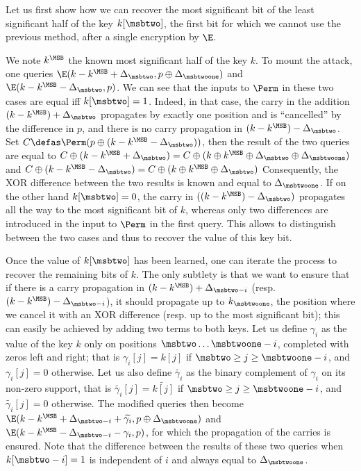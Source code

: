 Let us first show how we can recover the most significant bit of the least significant half of
the key $k[\msbtwo]$, \ie the first bit for which we cannot use the previous method,
after a single encryption by $\E$.

We note $k^\MSB$ the known most significant half of the key $k$.
To mount the attack, one queries $\E(k - k^\MSB + \Delta_\msbtwo, p \oplus \Delta_{\msbtwoone})$ and
$\E(k - k^\MSB - \Delta_\msbtwo, p)$. We can see that the inputs to $\Perm$ in these two cases are equal
iff $k[\msbtwo] = 1$. Indeed, in that case,
the carry in the addition $(k - k^\MSB) + \Delta_\msbtwo$ propagates by exactly one position and is ``cancelled'' by
the difference in $p$, and there is no carry propagation in $(k - k^\MSB) - \Delta_\msbtwo$.
Set $C \defas \Perm(p \oplus (k - k^\MSB - \Delta_\msbtwo))$, then
the result of the two queries are equal to
$C \oplus (k - k^\MSB + \Delta_\msbtwo) = C \oplus (k \oplus k^\MSB \oplus \Delta_\msbtwo \oplus \Delta_\msbtwoone)$ and
$C \oplus (k - k^\MSB - \Delta_\msbtwo) = C \oplus (k \oplus k^\MSB \oplus \Delta_\msbtwo)$
Consequently, the XOR difference between the two results is known and equal to $\Delta_\msbtwoone$.
If on the other hand
$k[\msbtwo] = 0$, the carry in $((k - k^\MSB) - \Delta_\msbtwo)$ propagates all the way to the most significant bit of $k$, whereas only
two differences are introduced in the input to $\Perm$ in the first query. This allows to distinguish between the two cases and thus to recover the value of this key bit.

Once the value of $k[\msbtwo]$ has been learned, one can iterate the process to recover the remaining bits of $k$.
The only subtlety is that we want to ensure that if there is a carry propagation in
$(k - k^\MSB) + \Delta_{\msbtwo - i}$ (resp. $(k - k^\MSB) - \Delta_{\msbtwo - i}$),
it should propagate up to $k_{\msbtwoone}$, the position where we cancel it with an XOR difference
(resp. up to the most significant bit); this can easily be achieved by adding two terms to both keys.
Let us define $\gamma_i$ as the value of the key $k$ only on positions $\msbtwo\ldots\msbtwoone - i$, completed with zeros left and right;
that is $\gamma_i[j] = k[j]$ if $\msbtwo \geq j \geq \msbtwoone - i$, and $\gamma_i[j] = 0$ otherwise.
Let us also define $\widetilde{\gamma_i}$ as the binary complement of $\gamma_i$ on its non-zero support,
that is $\widetilde{\gamma_i}[j] = \widetilde{k[j]}$ if $\msbtwo \geq j \geq \msbtwoone - i$, and $\widetilde{\gamma_i}[j] = 0$ otherwise.
The modified queries then become $\E(k - k^\MSB + \Delta_{\msbtwo - i} + \widetilde{\gamma_i}, p \oplus \Delta_{\msbtwoone})$ and
$\E(k - k^\MSB - \Delta_{\msbtwo - i} - \gamma_i, p)$, for which the propagation of the carries is ensured. Note that
the difference between the results of these two queries when $k[\msbtwo - i] = 1$ is independent of $i$ and always equal
to $\Delta_\msbtwoone$.


